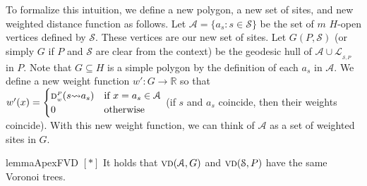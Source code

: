 \documentclass[a4paper,UKenglish]{socg-lipics-v2018}
\newcommand{\s}{\mathcal S}
\newcommand{\g}[3][P]{\ensuremath{\textsc{g}^{\scriptscriptstyle #1}(#2, #3)}}
\newcommand{\dd}[3][P]{\ensuremath{\textsc{d}_{\scriptscriptstyle w}^{\scriptscriptstyle #1}(#2 {\leadsto} #3)}}
\newcommand{\ddw}[3][P]{\ensuremath{\textsc{d}_{\scriptscriptstyle w'}^{\scriptscriptstyle #1}(#2 {\leadsto} #3)}}
\newcommand{\p}[3][P]{\ensuremath{\pi_{_{#1}}(#2, #3)}}
\newcommand{\cell}[2][P]{\ensuremath{\mathtt{Cell}_{\scriptscriptstyle #1}(#2)}}
\newcommand{\vd}[2][P]{\textsc{vd}(#2, #1)}
\newcommand{\LL}[1][\s, P]{\ensuremath{\mathcal L_{_{#1}}}}
\newcommand{\A}{\ensuremath{\mathcal A}}
\begin{document}
To formalize this intuition, we define a new polygon, a new set of sites, and new weighted distance function as follows.
Let $\A = \{a_s: s\in \s\}$ be the set of $m$ $H$-open vertices defined by $\s$. These vertices are our new set of sites.
Let $G(P, \s)$ (or simply $G$ if $P$ and $\s$ are clear from the context) be the geodesic hull of $\A\cup \LL$ in $P$.
Note that $G\subseteq H$ is a simple polygon by the definition of each $a_s$ in $\A$.
We define a new weight function $w':G\to \mathbb{R}$ so that $w'(x) = \begin{cases} \dd{s}{a_s}& \text{if }x=a_s\in \A \\ 0&\text{otherwise} \end{cases}$  (if $s$ and $a_s$ coincide, then their weights coincide).
With this new weight function, we can think of $\A$ as a set of weighted sites in $G$.

\begin{restatable}{lemma}{ApexFVD}\label{lemma:ApexFVD}
$[*]$ 
It holds that $\vd[G]{\A}$ and $\vd[P]{\s}$ have the same Voronoi trees.
\end{restatable}
\newcommand{\ProofApexFVD}{
\ApexFVD*
\begin{proof}
Notice that $G$ is a subset of $H$ such that $int(G)\subset int(H)$.
Let $s$ be a site of $\s$ and let $x\in G$. 
Because $G$ is a geodesically convex subset of $P$, and since $a_s, x\in G$, we know that $\p[G]{a_s}{x} = \p{a_s}{x}$, and hence the length of these paths is simply $\g{a_s}{x}$ . 
Therefore, we know that  $\ddw[G]{a_s}{x} = w'(a_s) + \g{a_s}{x} = \dd{s}{a_s} + \g{a_s}{x} = \dd{s}{x}$.
That is, the $w'$-distance from any site in $a_s \in \A$ to any point $x$ in $G$ is the same as the $w$-distance from the corresponding site in $s\in \s$ to the same point $x$ in $P$, which implies that $\cell[G]{s, \s} \subseteq \cell{s, \s}$. 
Because this happens for each Voronoi cell of $\s$ in $G$, the Voronoi trees coincide. 
\end{proof}
}
\end{document}
